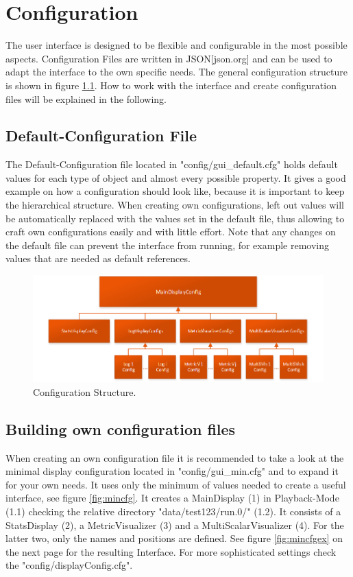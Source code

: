 \chapter{Configuration}
The user interface is designed to be flexible and configurable in the most possible aspects. Configuration Files are written in JSON[json.org] and can be used to adapt the interface to the own specific needs. The general configuration structure is shown in figure \ref{fig:configstruct}. How to work with the interface and create configuration files will be explained in the following.

\section{Default-Configuration File}
The Default-Configuration file located in "config/gui{\_}default.cfg" holds default values for each type of object and almost every possible property. It gives a good example on how a configuration should look like, because it is important to keep the hierarchical structure. When creating own configurations, left out values will be automatically replaced with the values set in the default file, thus allowing to craft own configurations easily and with little effort. Note that any changes on the default file can prevent the interface from running, for example removing values that are needed as default references.

\begin{figure} [h]
\centering
\includegraphics [scale=1] {images/configstruct}
\caption{Configuration Structure.}
\label{fig:configstruct}
\end{figure}

\section{Building own configuration files}
When creating an own configuration file it is recommended to take a look at the minimal display configuration located in "config/gui{\_}min.cfg" and to expand it for your own needs. It uses only the minimum of values needed to create a useful interface, see figure \ref{fig:mincfg}. It creates a MainDisplay (1) in Playback-Mode (1.1) checking the relative directory "data/test123/run.0/" (1.2). It consists of a StatsDisplay (2), a MetricVisualizer (3) and a MultiScalarVisualizer (4). For the latter two, only the names and positions are defined. See figure \ref{fig:mincfgex} on the next page for the resulting Interface. For more sophisticated settings check the "config/displayConfig.cfg".

